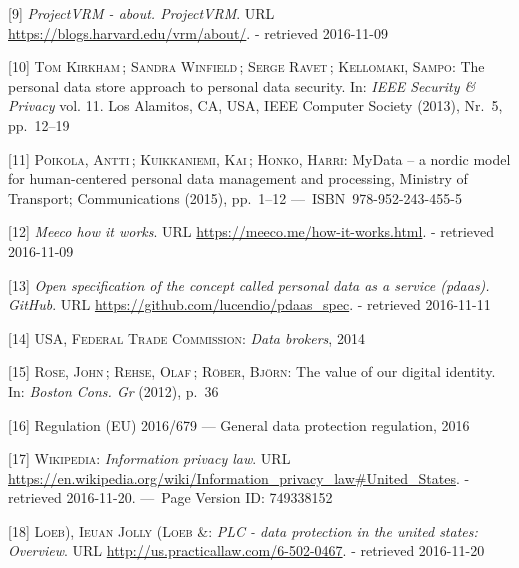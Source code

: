 \documentclass[12pt,english,a4paper,titlepage,cleardoublepage=empty,dottedtoc]{report}
\begin{document}
\hypertarget{ref-web_2010_projectvrm_about}{}
{[}9{]} \emph{ProjectVRM - about. ProjectVRM}. URL
\url{https://blogs.harvard.edu/vrm/about/}. - retrieved 2016-11-09

\hypertarget{ref-paper_2013_the-personal-data-store-approach-to-personal-data-security_2013}{}
{[}10{]} \textsc{Tom Kirkham}\,; \textsc{Sandra Winfield}\,;
\textsc{Serge Ravet}\,; \textsc{Kellomaki, Sampo}: The personal data
store approach to personal data security. In: \emph{IEEE Security \&
Privacy} vol. 11. Los Alamitos, CA, USA, IEEE Computer Society (2013),
Nr.~5, pp.~12--19

\hypertarget{ref-whitepaper_2014_mydata-a-nordic-model-for-human-centered-personal-data-management-and-processing}{}
{[}11{]} \textsc{Poikola, Antti}\,; \textsc{Kuikkaniemi, Kai}\,;
\textsc{Honko, Harri}: MyData -- a nordic model for human-centered
personal data management and processing, Ministry of Transport;
Communications (2015), pp.~1--12 ---~ISBN~978-952-243-455-5

\hypertarget{ref-web_2016_meeco-how-it-works}{}
{[}12{]} \emph{Meeco how it works}. URL
\url{https://meeco.me/how-it-works.html}. - retrieved 2016-11-09

\hypertarget{ref-repo_2016_pdaas-spec}{}
{[}13{]} \emph{Open specification of the concept called personal data as
a service (pdaas). GitHub}. URL
\url{https://github.com/lucendio/pdaas_spec}. - retrieved 2016-11-11

\hypertarget{ref-report_2014_data-brokers}{}
{[}14{]} \textsc{USA, Federal Trade Commission}: \emph{Data brokers},
2014

\hypertarget{ref-whitepaper_2012_the-value-of-our-digital-identity_definition}{}
{[}15{]} \textsc{Rose, John}\,; \textsc{Rehse, Olaf}\,; \textsc{Röber,
Björn}: The value of our digital identity. In: \emph{Boston Cons. Gr}
(2012), p.~36

\hypertarget{ref-regulation_2016_eu_general-data-protection-regulation_definition}{}
{[}16{]} Regulation (EU) 2016/679 --- General data protection
regulation, 2016

\hypertarget{ref-web_2016_wikipedia_information-privacy-law_us}{}
{[}17{]} \textsc{Wikipedia}: \emph{Information privacy law}. URL
\url{https://en.wikipedia.org/wiki/Information_privacy_law\#United_States}.
- retrieved 2016-11-20. ---~Page Version ID: 749338152

\hypertarget{ref-web_2016_data-protection-laws-in-the-us}{}
{[}18{]} \textsc{Loeb), Ieuan Jolly (Loeb \&}: \emph{PLC - data
protection in the united states: Overview}. URL
\url{http://us.practicallaw.com/6-502-0467}. - retrieved 2016-11-20
\end{document}
